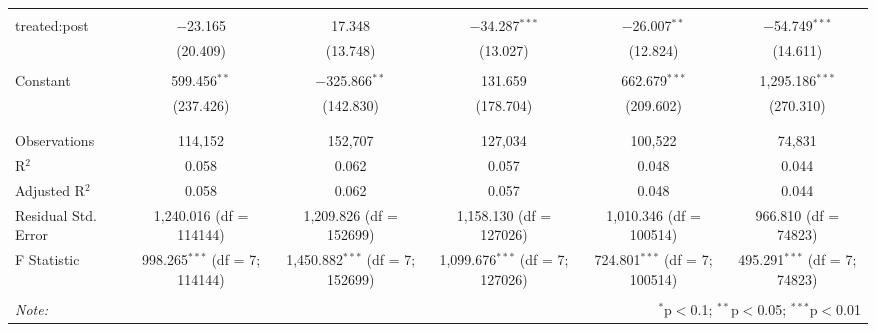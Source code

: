 \begin{table}[!htbp]
\begin{tabular}{@{\extracolsep{5pt}}lccccc}
  & & & & & \\ 
 treated:post & $-$23.165 & 17.348 & $-$34.287$^{***}$ & $-$26.007$^{**}$ & $-$54.749$^{***}$ \\ 
  & (20.409) & (13.748) & (13.027) & (12.824) & (14.611) \\ 
  & & & & & \\ 
 Constant & 599.456$^{**}$ & $-$325.866$^{**}$ & 131.659 & 662.679$^{***}$ & 1,295.186$^{***}$ \\ 
  & (237.426) & (142.830) & (178.704) & (209.602) & (270.310) \\ 
  & & & & & \\ 
\hline \\[-1.8ex] 
Observations & 114,152 & 152,707 & 127,034 & 100,522 & 74,831 \\ 
R$^{2}$ & 0.058 & 0.062 & 0.057 & 0.048 & 0.044 \\ 
Adjusted R$^{2}$ & 0.058 & 0.062 & 0.057 & 0.048 & 0.044 \\ 
Residual Std. Error & 1,240.016 (df = 114144) & 1,209.826 (df = 152699) & 1,158.130 (df = 127026) & 1,010.346 (df = 100514) & 966.810 (df = 74823) \\ 
F Statistic & 998.265$^{***}$ (df = 7; 114144) & 1,450.882$^{***}$ (df = 7; 152699) & 1,099.676$^{***}$ (df = 7; 127026) & 724.801$^{***}$ (df = 7; 100514) & 495.291$^{***}$ (df = 7; 74823) \\ 
\hline 
\hline \\[-1.8ex] 
\textit{Note:}  & \multicolumn{5}{r}{$^{*}$p$<$0.1; $^{**}$p$<$0.05; $^{***}$p$<$0.01} \\ 
\end{tabular} 
\end{table} 
